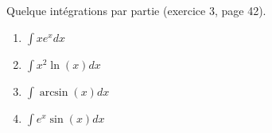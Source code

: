 \begin{exercice}\label{exo0019}

Quelque intégrations par partie (exercice 3, page 42).
\begin{enumerate}

\item
$\int xe^x dx$
\item
$\int x^2\ln(x) dx$
\item
$\int \arcsin(x) dx$
\item
$\int e^x\sin(x) dx$

\end{enumerate}

\end{exercice}
